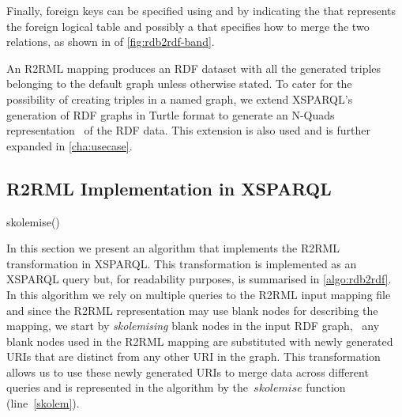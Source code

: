 Finally, foreign keys can be specified using  and by indicating the  that represents
the foreign logical table and possibly a  that specifies how to merge the two relations, as shown in
 of \cref{fig:rdb2rdf-band}.

An R2RML mapping produces an \ac{RDF} dataset with all the generated triples belonging to the default graph unless
otherwise stated.
%
To cater for the possibility of creating triples in a named graph, we extend XSPARQL's generation of \ac{RDF} graphs in
Turtle format to generate an N-Quads representation~\cite{CyganiakHarthHogan:2009aa} of the \ac{RDF} data.
%
This extension is also used and is further expanded in \cref{cha:usecase}.


\subsection{R2RML Implementation in XSPARQL}
\label{sec:r2rml-xsparql}


%
\begin{algorithm}[t]
  \caption{ }
  \label{algo:rdb2rdf}
  \DontPrintSemicolon
  \kwLet {} \Assign skolemise() \; 
  \SPARQLForClause * \; 
\end{algorithm}

In this section we present an algorithm that implements the R2RML transformation in XSPARQL.
%
This transformation is implemented as an XSPARQL query but, for readability purposes, is summarised in
\cref{algo:rdb2rdf}.  
%
In this algorithm we rely on multiple queries to the R2RML input mapping file and since the R2RML representation may use
blank nodes for describing the mapping, we start by \emph{skolemising} blank nodes in the input \ac{RDF} graph, \ie~any
blank nodes used in the R2RML mapping are substituted with newly generated URIs that are distinct from any other URI in
the graph. This transformation allows us to use these newly generated URIs to merge data across different queries and is
represented in the algorithm by the~$\mathit{skolemise}$ function (line~\ref{skolem}).

